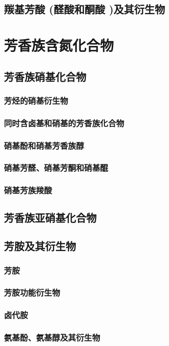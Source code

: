 \documentclass[UTF8]{../03-Chemistry}
\begin{document}
    \subsection{羰基芳酸 (醛酸和酮酸 )及其衍生物}
\section{芳香族含氮化合物}
    \subsection{芳香族硝基化合物}
        \subsubsection{芳烃的硝基衍生物}
        \subsubsection{同时含卤基和硝基的芳香族化合物}
        \subsubsection{硝基酚和硝基芳香族醇}
        \subsubsection{硝基芳醛、硝基芳酮和硝基醌}
        \subsubsection{硝基芳族羧酸}
    \subsection{芳香族亚硝基化合物}
    \subsection{芳胺及其衍生物}
        \subsubsection{芳胺}
        \subsubsection{芳胺功能衍生物}
        \subsubsection{卤代胺}
        \subsubsection{氨基酚、氨基醇及其衍生物}
\end{document}
